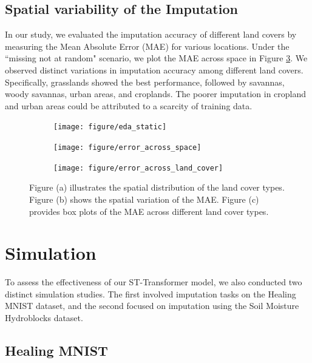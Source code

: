 \documentclass[11pt]{article}
\begin{document}
\subsection{Spatial variability of the Imputation}
In our study, we evaluated the imputation accuracy of different land covers by measuring the Mean Absolute Error (MAE) for various locations. Under the ``missing not at random" scenario, we plot the MAE across space in Figure \ref{fig: mae_across_space}. We observed distinct variations in imputation accuracy among different land covers. Specifically, grasslands showed the best performance, followed by savannas, woody savannas, urban areas, and croplands. The poorer imputation in cropland and urban areas could be attributed to a scarcity of training data.


\begin{figure}
     \centering
      \begin{subfigure}[b]{0.45\textwidth}
		\centering
		\texttt{[image: figure/eda\_static]}
		\caption{}
		\label{fig: missing at time points}
	 \end{subfigure}
         \hfill
      \begin{subfigure}[b]{0.45\textwidth}
         \texttt{[image: figure/error\_across\_space]}
		 \caption{}
	\label{fig: missing at random}
     \end{subfigure}
     
    \begin{subfigure}[b]{\textwidth}
	\texttt{[image: figure/error\_across\_land\_cover]}
	\end{subfigure}
    
     \caption{Figure (a) illustrates the spatial distribution of the land cover types. Figure (b) shows the spatial variation of the MAE. Figure (c) provides box plots of the MAE across different land cover types.}
     \label{fig: mae_across_space}
\end{figure}




\section{Simulation} 
To assess the effectiveness of our ST-Transformer model, we also conducted two distinct simulation studies. The first involved imputation tasks on the Healing MNIST dataset, and the second focused on imputation using the Soil Moisture Hydroblocks dataset.



\subsection{Healing MNIST}
\end{document}
